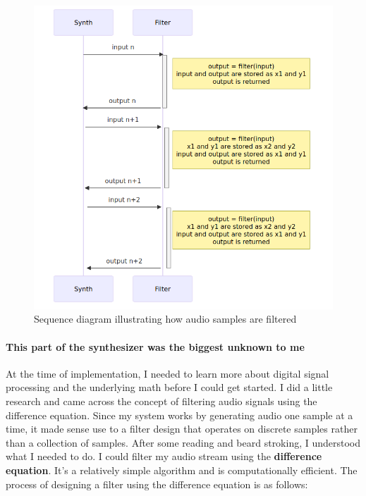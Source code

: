 \documentclass[acmlarge,screen]{acmart}
\begin{document}
	\begin{figure}
		\centering
		\includegraphics[width=\linewidth]{filter_sequence_diagram}
		\caption{Sequence diagram illustrating how audio samples are filtered}
	\end{figure}

	\paragraph{This part of the synthesizer was the biggest unknown to me} At the time of implementation, I needed to learn more about digital signal processing and the underlying math before I could get started. I did a little research and came across the concept of filtering audio signals using the difference equation. Since my system works by generating audio one sample at a time, it made sense use to a filter design that operates on discrete samples rather than a collection of samples. After some reading and beard stroking, I understood what I needed to do. I could filter my audio stream using the \textbf{difference equation}\cite{duke_2000}. It's a relatively simple algorithm and is computationally efficient. The process of designing a filter using the difference equation is as follows:
	
\end{document}
